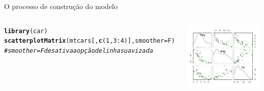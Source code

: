 \documentclass{beamer}\usepackage[]{graphicx}\usepackage[]{color}
\makeatletter
\newcommand{\hlnum}[1]{\textcolor[rgb]{0.686,0.059,0.569}{#1}}%
\newcommand{\hlcom}[1]{\textcolor[rgb]{0.678,0.584,0.686}{\textit{#1}}}%
\newcommand{\hlopt}[1]{\textcolor[rgb]{0,0,0}{#1}}%
\newcommand{\hlstd}[1]{\textcolor[rgb]{0.345,0.345,0.345}{#1}}%
\newcommand{\hlkwc}[1]{\textcolor[rgb]{0.333,0.667,0.333}{#1}}%
\newcommand{\hlkwd}[1]{\textcolor[rgb]{0.737,0.353,0.396}{\textbf{#1}}}%
\newenvironment{kframe}{%
 \def\at@end@of@kframe{}%
 \ifinner\ifhmode%
  \def\at@end@of@kframe{\end{minipage}}%
  \begin{minipage}{\columnwidth}%
 \fi\fi%
 \def\FrameCommand##1{\hskip\@totalleftmargin \hskip-\fboxsep
 \colorbox{shadecolor}{##1}\hskip-\fboxsep
     \hskip-\linewidth \hskip-\@totalleftmargin \hskip\columnwidth}%
 \MakeFramed {\advance\hsize-\width
   \@totalleftmargin\z@ \linewidth\hsize
   \@setminipage}}%
 {\par\unskip\endMakeFramed%
 \at@end@of@kframe}
\newenvironment{knitrout}{}{} %
\renewenvironment{knitrout}{\setlength{\topsep}{0mm}}{}
\makeatother
\begin{document}
\begin{frame}{O processo de construção do modelo}

\begin{columns}


\begin{knitrout}\tiny
{}\color{fgcolor}\begin{kframe}
\begin{alltt}
\hlkwd{library}\hlstd{(car)}
\hlkwd{scatterplotMatrix}\hlstd{(mtcars[,}\hlkwd{c}\hlstd{(}\hlnum{1}\hlstd{,}\hlnum{3}\hlopt{:}\hlnum{4}\hlstd{)],}\hlkwc{smoother}\hlstd{=F)}
\hlcom{# smoother = F desativa a opção de linha suavizada}
\end{alltt}
\end{kframe}
\end{knitrout}




\begin{knitrout}\tiny
{}\color{fgcolor}
\includegraphics[width=1\linewidth]{figure/corplot-1} 

\end{knitrout}

\end{columns}

\end{frame}
\end{document}
